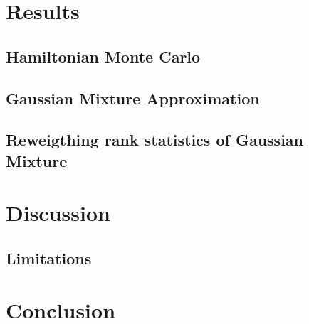 \documentclass[12pt, a4paper]{article}
\begin{document}

\section{Results}

    \subsection{Hamiltonian Monte Carlo}

    \subsection{Gaussian Mixture Approximation}

    \subsection{Reweigthing rank statistics of Gaussian Mixture}

\section{Discussion}

\subsection{Limitations}

\section{Conclusion}

\newpage


\end{document}
